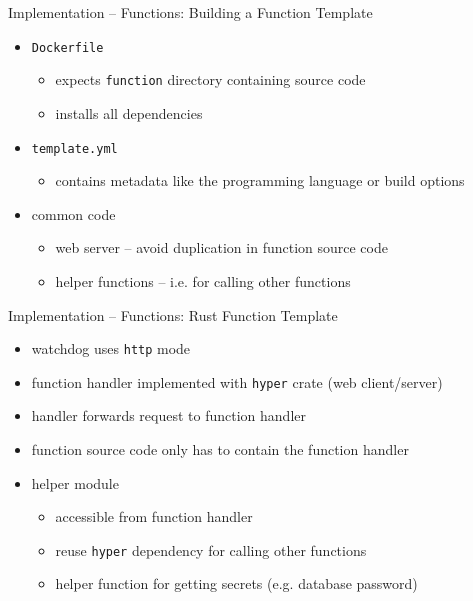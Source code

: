 \begin{frame}{Implementation -- Functions: Building a Function Template}
  \begin{itemize}
    \item \texttt{Dockerfile}
      \begin{itemize}
        \item expects \texttt{function} directory containing source code
        \item installs all dependencies
      \end{itemize}
    \item \texttt{template.yml}
      \begin{itemize}
        \item contains metadata like the programming language or build options
      \end{itemize}
    \item common code
      \begin{itemize}
        \item web server -- avoid duplication in function source code
        \item helper functions -- i.e. for calling other functions
      \end{itemize}
  \end{itemize}
\end{frame}

\begin{frame}{Implementation -- Functions: Rust Function Template}
  \begin{itemize}
    \item watchdog uses \texttt{http} mode
    \item function handler implemented with \texttt{hyper} crate (web client/server)
    \item handler forwards request to function handler
    \item function source code only has to contain the function handler
    \item helper module
      \begin{itemize}
        \item accessible from function handler
        \item reuse \texttt{hyper} dependency for calling other functions
        \item helper function for getting secrets (e.g. database password)
      \end{itemize}
  \end{itemize}
\end{frame}

